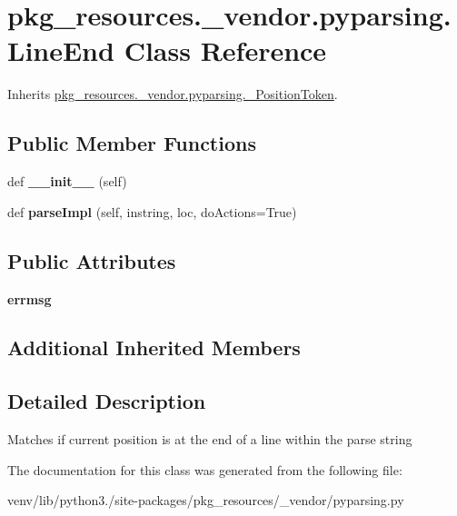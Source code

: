 \hypertarget{classpkg__resources_1_1__vendor_1_1pyparsing_1_1_line_end}{}\section{pkg\+\_\+resources.\+\_\+vendor.\+pyparsing.\+Line\+End Class Reference}
\label{classpkg__resources_1_1__vendor_1_1pyparsing_1_1_line_end}


Inherits \hyperlink{classpkg__resources_1_1__vendor_1_1pyparsing_1_1___position_token}{pkg\+\_\+resources.\+\_\+vendor.\+pyparsing.\+\_\+\+Position\+Token}.

\subsection*{Public Member Functions}
\begin{DoxyCompactItemize}
\item 
\mbox{\label{classpkg__resources_1_1__vendor_1_1pyparsing_1_1_line_end_adf8a08efef5c256c4c61aafe4860c659}} 
def {\bfseries \+\_\+\+\_\+init\+\_\+\+\_\+} (self)
\item 
\mbox{\label{classpkg__resources_1_1__vendor_1_1pyparsing_1_1_line_end_a9bfc547e9595456efcc8266fe71d80f9}} 
def {\bfseries parse\+Impl} (self, instring, loc, do\+Actions=True)
\end{DoxyCompactItemize}
\subsection*{Public Attributes}
\begin{DoxyCompactItemize}
\item 
\mbox{\label{classpkg__resources_1_1__vendor_1_1pyparsing_1_1_line_end_a3029a49045592265c38d7f85bb19c5a3}} 
{\bfseries errmsg}
\end{DoxyCompactItemize}
\subsection*{Additional Inherited Members}


\subsection{Detailed Description}
\begin{DoxyVerb}Matches if current position is at the end of a line within the parse string
\end{DoxyVerb}
 

The documentation for this class was generated from the following file\+:\begin{DoxyCompactItemize}
\item 
venv/lib/python3./site-\/packages/pkg\+\_\+resources/\+\_\+vendor/pyparsing.\+py\end{DoxyCompactItemize}
